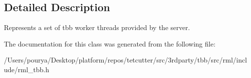 \subsection{Detailed Description}
Represents a set of tbb worker threads provided by the server. 

The documentation for this class was generated from the following file\+:\begin{DoxyCompactItemize}
\item 
/\+Users/pourya/\+Desktop/platform/repos/tetcutter/src/3rdparty/tbb/src/rml/include/rml\+\_\+tbb.\+h\end{DoxyCompactItemize}
